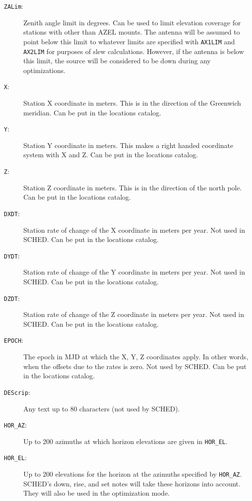 \documentclass{report}
\newcommand{\sched}{{\sc SCHED}}
\begin{document}
\begin{description}
\item [{\tt ZALim}:] Zenith angle limit in degrees.  Can be used to
limit elevation coverage for stations with other than AZEL mounts.
The antenna will be assumed to point below this limit to whatever
limits are specified with {\tt AX1LIM} and {\tt AX2LIM} for purposes
of slew calculations.  However, if the antenna is below this limit,
the source will be considered to be down during any optimizations.

\item [{\tt X}:] Station X coordinate in meters.  This is in the
direction of the Greenwich meridian.  Can be put in the locations
catalog.

\item [{\tt Y}:] Station Y coordinate in meters.  This makes a right
handed coordinate system with X and Z.  Can be put in the locations
catalog.

\item [{\tt Z}:] Station Z coordinate in meters.  This is in the
direction of the north pole.  Can be put in the locations catalog.

\item [{\tt DXDT}:] Station rate of change of the X coordinate in
meters per year.  Not used in \sched.  Can be put in the locations
catalog.

\item [{\tt DYDT}:] Station rate of change of the Y coordinate
in meters per year.  Not used in \sched.  Can be put in the locations
catalog.

\item [{\tt DZDT}:] Station rate of change of the Z coordinate
in meters per year.  Not used in \sched.  Can be put in the locations
catalog.

\item [{\tt EPOCH}:] The epoch in MJD at which the X, Y, Z
coordinates apply.  In other words, when the offsets due to the
rates is zero.  Not used by \sched.  Can be put in the locations
catalog.

\item [{\tt DEScrip}:] Any text up to 80 characters (not used
by \sched).

\item [{\tt HOR\_AZ}:] Up to 200 azimuths at which horizon elevations
are given in {\tt HOR\_EL}.

\item [{\tt HOR\_EL}:] Up to 200 elevations for the horizon at the
azimuths specified by {\tt HOR\_AZ}. \sched's down, rise, and set
notes will take these horizons into account. They will also be used in
the optimization mode.


\end{description}
\end{document}
